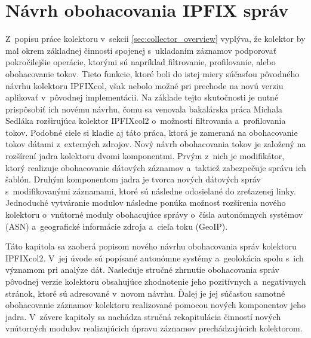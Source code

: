 \chapter{Návrh obohacovania IPFIX správ}
\label{chpt:obohacovanie}

Z~popisu práce kolektoru v~sekcii \ref{sec:collector_overview} vyplýva, že kolektor by mal okrem základnej činnosti spojenej s~ukladaním záznamov podporovať pokročilejšie operácie, ktorými sú napríklad filtrovanie, profilovanie, alebo obohacovanie tokov. Tieto funkcie, ktoré boli do istej miery
súčasťou pôvodného návrhu kolektoru IPFIXcol, však nebolo možné pri prechode na novú verziu aplikovať v~pôvodnej implementácii. Na základe tejto skutočnosti je nutné prispôsobiť ich novému návrhu, čomu sa venovala bakalárska práca Michala Sedláka \cite{sedlak} rozširujúca kolektor IPFIXcol2 o~možnosti
filtrovania a~profilovania tokov. Podobné ciele si kladie aj táto práca, ktorá je zameraná na obohacovanie tokov dátami z~externých zdrojov. Nový návrh obohacovania tokov je založený na rozšírení jadra kolektoru dvomi komponentmi. Prvým z~nich je modifikátor, ktorý realizuje
obohacovanie dátových záznamov a~taktiež zabezpečuje správu ich šablón. Druhým komponentom jadra je tvorca nových dátových správ s~modifikovanými záznamami, ktoré sú následne odosielané do zreťazenej linky.
Jednoduché vytváranie modulov následne ponúka možnosť rozšírenia nového kolektoru o~vnútorné moduly obohacujúce správy o~čísla autonómnych systémov (ASN) a~geografické informácie zdroja a~cieľa toku (GeoIP).

Táto kapitola sa zaoberá popisom nového návrhu obohacovania správ kolektoru IPFIX\-col2. V~jej úvode sú popísané autonómne systémy a~geolokácia spolu s~ich významom pri analýze dát.
Nasleduje stručné zhrnutie obohacovania správ pôvodnej verzie kolektoru obsahujúce zhodnotenie jeho pozitívnych a~negatívnych stránok, ktoré sú adresované v~novom návrhu.
Ďalej je jej súčasťou samotné obohacovanie záznamov kolektoru realizované pomocou nových komponentov jeho jadra. V~závere kapitoly sa nachádza stručná rekapitulácia činností nových vnútorných modulov realizujúcich úpravu záznamov
prechádzajúcich kolektorom.

